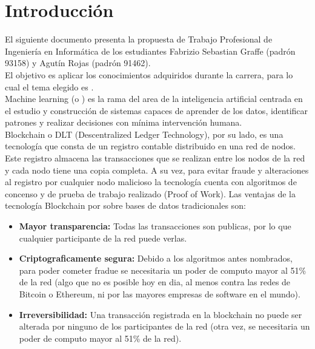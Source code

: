 \documentclass[
11pt, %
spanish, %
singlespacing, %
headsepline, %
]{MastersDoctoralThesis} %
\begin{document}

\tableofcontents %


\mainmatter %

\pagestyle{thesis} %

\chapter{Introducci\'on}
El siguiente documento presenta la propuesta de Trabajo Profesional de Ingeniería en Informática de los estudiantes Fabrizio Sebastian Graffe (padrón 93158) y Agutín Rojas (padrón 91462). \\

El objetivo es aplicar los conocimientos adquiridos durante la carrera, para lo cual el tema elegido es \textbf{ }. \\

Machine learning (o ) es la rama del area de la inteligencia artificial centrada en el estudio y construcción de sistemas capaces de aprender de los datos, identificar patrones y realizar decisiones con mínima intervención humana. \\

Blockchain o DLT (Descentralized Ledger Technology), por su lado, es una tecnología que consta de un registro contable distribuido en una red de nodos. Este registro almacena las transacciones que se realizan entre los nodos de la red y cada nodo tiene una copia completa. A su vez, para evitar fraude y alteraciones al registro por cualquier nodo malicioso la tecnología cuenta con algoritmos de concenso y de prueba de trabajo realizado (Proof of Work).
Las ventajas de la tecnología Blockchain por sobre bases de datos tradicionales son:
\begin{itemize}
\item \textbf{Mayor transparencia:} Todas las transacciones son publicas, por lo que cualquier participante de la red puede verlas.
\item \textbf{Criptograficamente segura:} Debido a los algoritmos antes nombrados, para poder cometer fradue se necesitaria un poder de computo mayor al 51\% de la red (algo que no es posible hoy en dia, al menos contra las redes de Bitcoin o Ethereum, ni por las mayores empresas de software en el mundo).
\item \textbf{Irreversibilidad:} Una transacción registrada en la blockchain no puede ser alterada por ninguno de los participantes de la red (otra vez, se necesitaria un poder de computo mayor al 51\% de la red).
\end{itemize}
\end{document}
